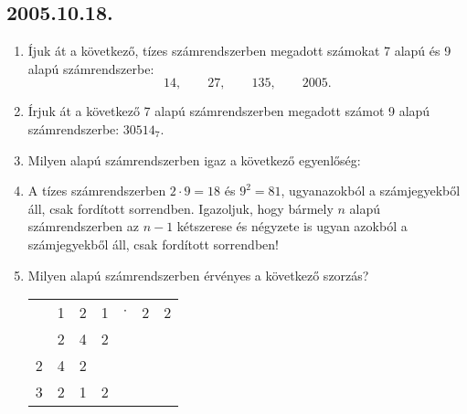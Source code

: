 \subsection*{2005.10.18.}
\begin{enumerate}
\item Íjuk át a következő, tízes számrendszerben megadott számokat 7 alapú és 9 alapú számrendszerbe: $$14,\qquad 27,\qquad 135,\qquad 2005.$$

\item Írjuk át a következő 7 alapú számrendszerben megadott számot 9 alapú számrendszerbe: $30514_7$.

\item Milyen alapú számrendszerben igaz a következő egyenlőség: 


\item A tízes számrendszerben $2\cdot 9=18$ és $9^2=81$, ugyanazokból a számjegyekből áll, csak fordított sorrendben. Igazoljuk, hogy bármely $n$ alapú számrendszerben az $n-1$ kétszerese és négyzete is ugyan azokból a számjegyekből áll, csak fordított sorrendben!

\item Milyen alapú számrendszerben érvényes a következő szorzás?

\begin{tabular}{ccccccc}
  &1&2&1&$\cdot$&2&2\\
  \cline{1-4}
  & 2 & 4 & 2 & & & \\
2 & 4 & 2 &   & & & \\
  \cline{1-4}
3 & 2 & 1 & 2 & & & 
\end{tabular}

\end{enumerate}

